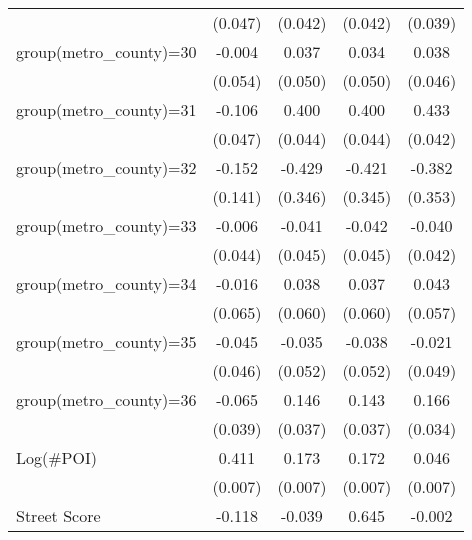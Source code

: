 {\begin{tabular}{l*{4}{c}}
                    &     (0.047)         &     (0.042)         &     (0.042)         &     (0.039)         \\
group(metro\_county)=30&      -0.004         &       0.037         &       0.034         &       0.038         \\
                    &     (0.054)         &     (0.050)         &     (0.050)         &     (0.046)         \\
group(metro\_county)=31&      -0.106\sym{**} &       0.400\sym{***}&       0.400\sym{***}&       0.433\sym{***}\\
                    &     (0.047)         &     (0.044)         &     (0.044)         &     (0.042)         \\
group(metro\_county)=32&      -0.152         &      -0.429         &      -0.421         &      -0.382         \\
                    &     (0.141)         &     (0.346)         &     (0.345)         &     (0.353)         \\
group(metro\_county)=33&      -0.006         &      -0.041         &      -0.042         &      -0.040         \\
                    &     (0.044)         &     (0.045)         &     (0.045)         &     (0.042)         \\
group(metro\_county)=34&      -0.016         &       0.038         &       0.037         &       0.043         \\
                    &     (0.065)         &     (0.060)         &     (0.060)         &     (0.057)         \\
group(metro\_county)=35&      -0.045         &      -0.035         &      -0.038         &      -0.021         \\
                    &     (0.046)         &     (0.052)         &     (0.052)         &     (0.049)         \\
group(metro\_county)=36&      -0.065\sym{*}  &       0.146\sym{***}&       0.143\sym{***}&       0.166\sym{***}\\
                    &     (0.039)         &     (0.037)         &     (0.037)         &     (0.034)         \\
Log(\#POI)          &       0.411\sym{***}&       0.173\sym{***}&       0.172\sym{***}&       0.046\sym{***}\\
                    &     (0.007)         &     (0.007)         &     (0.007)         &     (0.007)         \\
Street Score        &      -0.118\sym{***}&      -0.039\sym{***}&       0.645\sym{***}&      -0.002         \\

\end{tabular}}
